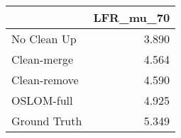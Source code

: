 \begin{tabular}{lr}
\toprule
{} & LFR_mu_70 \\
\midrule
No Clean Up  &     3.890 \\
Clean-merge  &     4.564 \\
Clean-remove &     4.590 \\
OSLOM-full   &     4.925 \\
Ground Truth &     5.349 \\
\bottomrule
\end{tabular}
